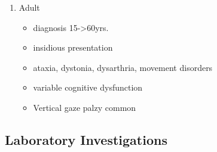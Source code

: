 \documentclass{scrartcl}
\begin{document}
\begin{enumerate}
\begin{enumerate}
\item Adult
\label{sec:org775bedd}
\begin{itemize}
\item diagnosis 15->60yrs.
\item insidious presentation
\item ataxia, dystonia, dysarthria, movement disorders
\item variable cognitive dysfunction
\item Vertical gaze palzy common
\end{itemize}
\end{enumerate}
\end{enumerate}

\subsection{Laboratory Investigations}
\label{sec:org04a4ed6}
\end{document}
